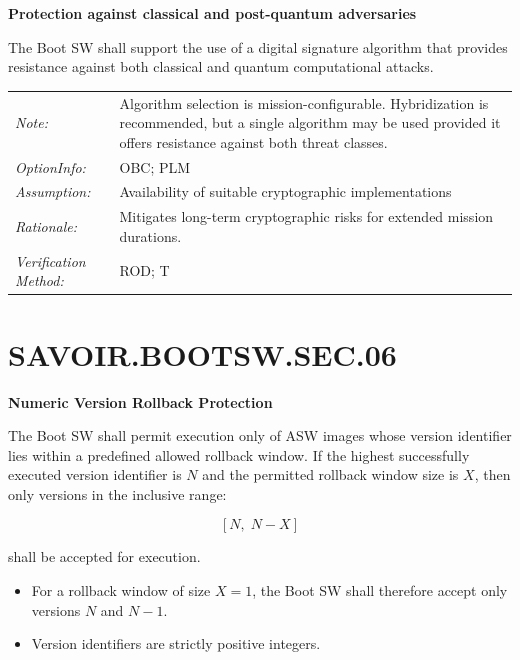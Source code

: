 \textbf{Protection against classical and post-quantum adversaries}

The Boot SW shall support the use of a digital signature algorithm that provides resistance against both classical and quantum computational attacks.

\vspace{6pt}

\begin{tabularx}{\textwidth}{@{}lX@{}}
\textit{Note:} & Algorithm selection is mission-configurable. Hybridization is recommended, but a single algorithm may be used provided it offers resistance against both threat classes. \\[6pt]
\textit{OptionInfo:} & OBC; PLM \\[6pt]
\textit{Assumption:} & Availability of suitable cryptographic implementations \\[6pt]
\textit{Rationale:} & Mitigates long-term cryptographic risks for extended mission durations. \\[6pt]
\textit{Verification Method:} & ROD; T \\[6pt]
\end{tabularx}

\headrule

\section*{SAVOIR.BOOTSW.SEC.06}

\textbf{Numeric Version Rollback Protection}

The Boot SW shall permit execution only of ASW images whose version identifier lies within a predefined allowed rollback window.  
If the highest successfully executed version identifier is $N$ and the permitted rollback window size is $X$, then only versions in the inclusive range:

\[
[N,\; N - X]
\]

shall be accepted for execution.

\vspace{6pt}

\begin{itemize}
\item For a rollback window of size $X=1$, the Boot SW shall therefore accept only versions $N$ and $N-1$.
\item Version identifiers are strictly positive integers.
\end{itemize}

\vspace{6pt}

